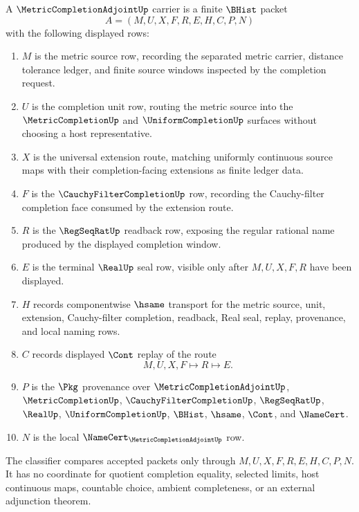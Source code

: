 \begin{definition}
\label{def:metric-completion-adjoint-carrier}
A $\MetricCompletionAdjointUp$ carrier is a finite $\BHist$ packet
$$
A=(M,U,X,F,R,E,H,C,P,N)
$$
with the following displayed rows:
\begin{enumerate}
\item $M$ is the metric source row, recording the separated metric carrier, distance tolerance ledger, and finite source windows inspected by the completion request.
\item $U$ is the completion unit row, routing the metric source into the $\MetricCompletionUp$ and $\UniformCompletionUp$ surfaces without choosing a host representative.
\item $X$ is the universal extension route, matching uniformly continuous source maps with their completion-facing extensions as finite ledger data.
\item $F$ is the $\CauchyFilterCompletionUp$ row, recording the Cauchy-filter completion face consumed by the extension route.
\item $R$ is the $\RegSeqRatUp$ readback row, exposing the regular rational name produced by the displayed completion window.
\item $E$ is the terminal $\RealUp$ seal row, visible only after $M,U,X,F,R$ have been displayed.
\item $H$ records componentwise $\hsame$ transport for the metric source, unit, extension, Cauchy-filter completion, readback, Real seal, replay, provenance, and local naming rows.
\item $C$ records displayed $\Cont$ replay of the route
$$
M,U,X,F \longmapsto R \longmapsto E .
$$
\item $P$ is the $\Pkg$ provenance over $\MetricCompletionAdjointUp$, $\MetricCompletionUp$, $\CauchyFilterCompletionUp$, $\RegSeqRatUp$, $\RealUp$, $\UniformCompletionUp$, $\BHist$, $\hsame$, $\Cont$, and $\NameCert$.
\item $N$ is the local $\NameCert_{\MetricCompletionAdjointUp}$ row.
\end{enumerate}
The classifier compares accepted packets only through $M,U,X,F,R,E,H,C,P,N$. It has no coordinate for quotient completion equality, selected limits, host continuous maps, countable choice, ambient completeness, or an external adjunction theorem.
\end{definition}

